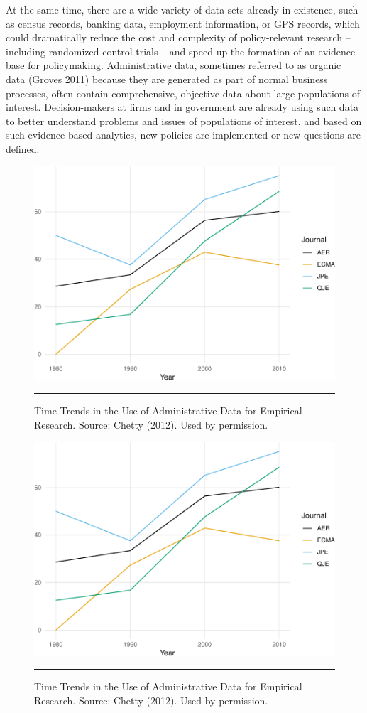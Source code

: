 \documentclass[11pt]{book}
\begin{document}
At the same time, there are a wide variety of data sets already in existence, such as census records, banking data, employment information, or GPS records, which could dramatically reduce the cost and complexity of policy-relevant research – including randomized control trials – and speed up the formation of an evidence base for policymaking. Administrative data, sometimes referred to as organic data (Groves 2011) because they are generated as part of normal business processes, often contain comprehensive, objective data about large populations of interest. Decision-makers at firms and in government are already using such data to better understand problems and issues of populations of interest, and based on such evidence-based analytics, new policies are implemented or new questions are defined.

\begin{figure}[t!]
\caption{Time Trends in the Use of Administrative Data for Empirical
Research. Source: Chetty (2012). Used by permission.}
\centering
\includegraphics{figures/introchetty-1.pdf}
\rule{1\textwidth}{0.3pt} 
\end{figure}


\begin{figure}[t!]

\centering
\includegraphics{figures/introchetty-1.pdf}
\caption{Time Trends in the Use of Administrative Data for Empirical
Research. Source: Chetty (2012). Used by permission.}
\rule{1\textwidth}{0.3pt} 
\end{figure}
\end{document}
